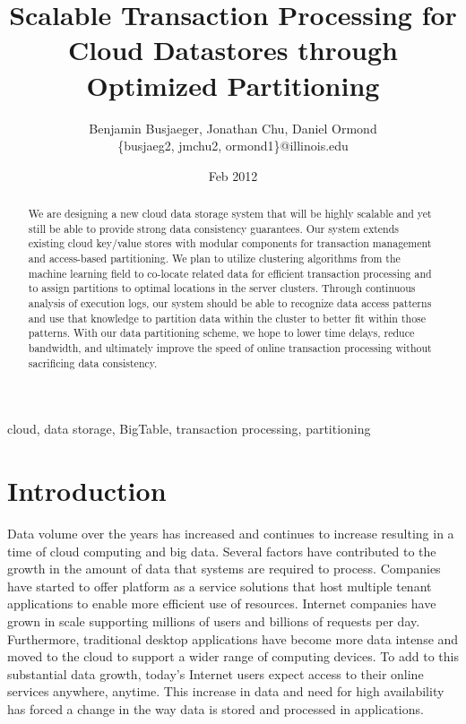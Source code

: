 \documentclass[10pt,final,journal]{IEEEtran}
\begin{document}
\title{Scalable Transaction Processing for Cloud Datastores through Optimized Partitioning}
\author{Benjamin Busjaeger, Jonathan Chu, Daniel Ormond \\
\{busjaeg2, jmchu2, ormond1\}@illinois.edu}
\date{Feb 2012}
\maketitle

\begin{abstract}
We are designing a new cloud data storage system that will be highly scalable and yet still be able to provide strong data consistency guarantees. Our system extends existing cloud key/value stores with modular components for transaction management and access-based partitioning. We plan to utilize clustering algorithms from the machine learning field to co-locate related data for efficient transaction processing and to assign partitions to optimal locations in the server clusters. Through continuous analysis of execution logs, our system should be able to recognize data access patterns and use that knowledge to partition data within the cluster to better fit within those patterns. With our data partitioning scheme, we hope to lower time delays, reduce bandwidth, and ultimately improve the speed of online transaction processing without sacrificing data consistency.
\end{abstract}

\begin{IEEEkeywords}
cloud, data storage, BigTable, transaction processing, partitioning
\end{IEEEkeywords}

\section{Introduction}
Data volume over the years has increased and continues to increase resulting in a time of cloud computing and big data. Several factors have contributed to the growth in the amount of data that systems are required to process. Companies have started to offer platform as a service solutions that host multiple tenant applications to enable more efficient use of resources. Internet companies have grown in scale supporting millions of users and billions of requests per day. Furthermore, traditional desktop applications have become more data intense and moved to the cloud to support a wider range of computing devices. To add to this substantial data growth, today's Internet users expect access to their online services anywhere, anytime. This increase in data and need for high availability has forced a change in the way data is stored and processed in applications.
\end{document}
